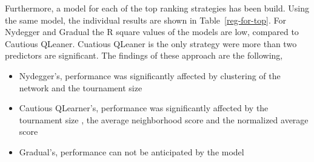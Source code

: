 Furthermore, a model for each of the top ranking strategies has been build.
Using the same model, the individual results are shown in Table~\ref{reg-for-top}.
For Nydegger and Gradual the R square values of the models are low, compared
to Cautious QLeaner. Cuatious QLeaner is the only strategy were more than two
predictors are significant. The findings of these approach are the following,

\begin{itemize}
	\item Nydegger's, performance was significantly affected by clustering of the network
				and the tournament size
	\item Cautious QLearner's, performance was significantly affected by the tournament size
				, the average neighborhood score and the normalized average score
	\item Gradual's, performance can not be anticipated by the model
\end{itemize}

